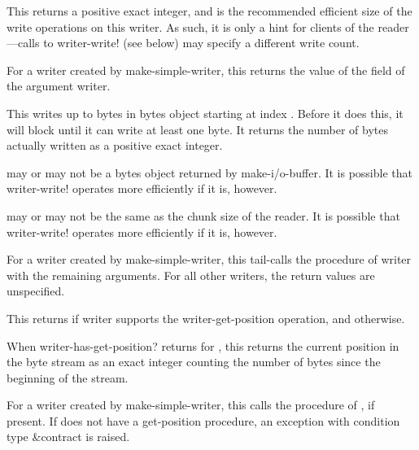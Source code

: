 \begin{entry}{%
}
   
This returns a positive exact integer, and is the recommended efficient
size of the write operations on this writer. As such, it is only a hint for
clients of the reader---calls to {\cf writer-write!} (see below) may specify a
different write count.

For a writer created by {\cf make-simple-writer}, this returns the value of the
 field of the argument writer.
\end{entry}

\begin{entry}{%
}
   
This writes up to  bytes in bytes object 
starting at index . Before it does this, it will block
until it can write at least one byte. It returns the number of bytes
actually written as a positive exact integer.
   
 may or may not be a bytes object returned by {\cf
  make-i/o-buffer}. It is possible that {\cf writer-write!} operates
more efficiently if it is, however.

 may or may not be the same as the chunk size of the reader. It is
possible that {\cf writer-write!} operates more efficiently if it is, however.

For a writer created by {\cf make-simple-writer}, this tail-calls the
 procedure of writer with the remaining arguments.  For
all other writers, the return values are unspecified.
\end{entry}   

\begin{entry}{%
}
   
This returns \schtrue{} if writer supports the {\cf
  writer-get-position} operation, and \schfalse{} otherwise.
\end{entry}   

\begin{entry}{%
}
   
When {\cf writer-has-get-position?} returns \schtrue{} for
, this returns the current position in the byte stream as
an exact integer counting the number of bytes since the beginning of
the stream.
  
For a writer created by {\cf make-simple-writer}, this calls the
 procedure of , if present. If 
does not have a get-position procedure, an exception with condition
type {\cf\&contract} is raised.
\end{entry}

